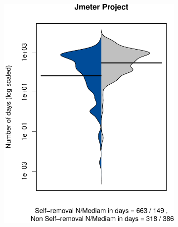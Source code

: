 \begin{figure}[t]
	 	\begin{subfigure}[b]{0.24\textwidth}
	 		\includegraphics[width=\textwidth]{figures/test/Jmeter.pdf}
	 		\label{fig:removal_comparison_gerrit}
	 	\end{subfigure}
	 	\begin{subfigure}[b]{0.24\textwidth}

\end{subfigure}
\end{figure}
